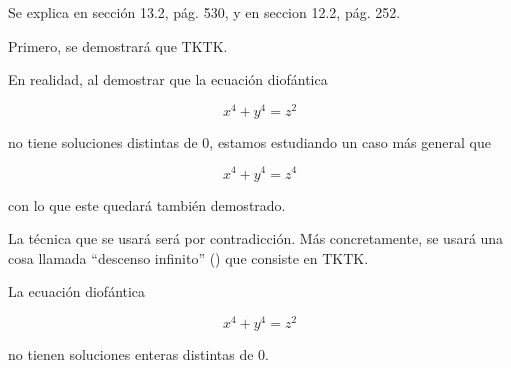 

Se explica en \cite{rosen} sección 13.2, pág. 530, y en
\cite{burton} seccion 12.2, pág. 252.






Primero, se demostrará que TKTK.

En realidad, al demostrar que la ecuación diofántica

$$ x^4 + y^4 = z^2 $$

\noindent no tiene soluciones distintas de 0, estamos estudiando un caso más
general que

$$ x^4 + y^4 = z^4 $$

\noindent con lo que este quedará también demostrado.

La técnica que se usará será por contradicción. Más concretamente, se usará
una cosa llamada ``descenso infinito'' () que
consiste en TKTK.

\begin{theorem}
  La ecuación diofántica

  $$ x^4 + y^4 = z^2 $$

  \noindent no tienen soluciones enteras distintas de 0.
\end{theorem}


